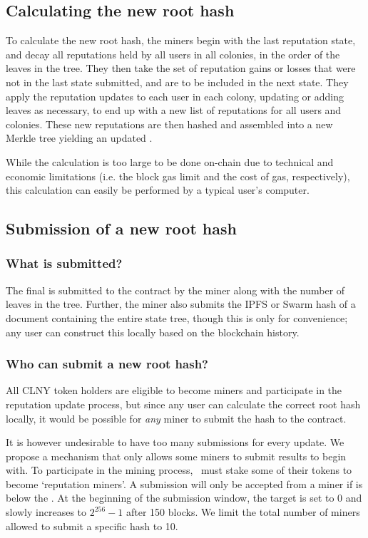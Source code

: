 \subsection{Calculating the new root hash}
To calculate the new root hash, the miners begin with the last reputation state, and decay all reputations held by all users in all colonies, in the order of the leaves in the tree. They then take the set of reputation gains or losses that were not in the last state submitted, and are to be included in the next state. They apply the reputation updates to each user in each colony, updating or adding leaves as necessary, to end up with a new list of reputations for all users and colonies. These new reputations are then hashed and assembled into a new Merkle tree yielding an updated .

While the calculation is too large to be done on-chain due to technical and economic limitations (i.e. the block gas limit and the cost of gas, respectively), this calculation can easily be performed by a typical user's computer.

\subsection{Submission of a new root hash}
%
\subsubsection*{What is submitted?}
The final  is submitted to the contract by the miner along with the number of leaves in the tree. Further, the miner also submits the IPFS or Swarm hash of a document containing the entire state tree, though this is only for convenience; any user can construct this locally based on the blockchain history.
%
\subsubsection*{Who can submit a new root hash?}
All CLNY token holders are eligible to become miners and participate in the reputation update process, but since any user can calculate the correct root hash locally, it would be possible for \emph{any} miner to submit the hash to the contract.

It is however undesirable to have too many submissions for every update. We propose a mechanism that only allows some miners to submit results to begin with. To participate in the mining process, \rcths\ must stake some of their tokens to become `reputation miners'. A submission will only be accepted from a miner if  is below the . At the beginning of the submission window, the target is set to 0 and slowly increases to $2^{256}-1$ after 150 blocks. We limit the total number of miners allowed to submit a specific hash to 10.

